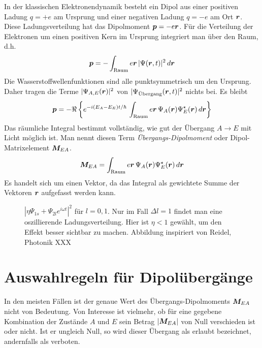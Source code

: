 In der klassischen Elektronendynamik besteht ein Dipol aus einer positiven Ladung $q=+e$ am Ursprung und einer negativen Ladung $q=-e$ am Ort $\boldsymbol{r}$. Diese Ladungsverteilung hat das Dipolmoment $\boldsymbol{p} = -e \boldsymbol{r}$. Für die Verteilung der Elektronen um einen positiven Kern im Ursprung integriert man über den Raum, d.h. 
\begin{equation}
    \boldsymbol{p} = - \int_\text{Raum} e\boldsymbol{r} \,  | \Psi(\boldsymbol{r}, t) |^2 \, d \boldsymbol{r} 
\end{equation}
Die Wasserstoffwellenfunktionen sind alle punktsymmetrisch um den Ursprung. Daher tragen die Terme $ | \Psi_{A,E}(\boldsymbol{r})|^2$ von $| \Psi_\text{Übergang}(\boldsymbol{r},t)|^2$ nichts bei. Es bleibt 
\begin{equation}
    \boldsymbol{p} =  - \Re \left \{ e^{-i (E_A - E_E) t / \hbar}  \, \int_\text{Raum} e\boldsymbol{r} \,  \Psi_A(\boldsymbol{r})\Psi_E^\star(\boldsymbol{r})  \, d \boldsymbol{r} \right \}
\end{equation}
Das räumliche Integral bestimmt vollständig, wie gut der Übergang $A \rightarrow E$ mit Licht möglich ist. Man nennt diesen Term \emph{Übergangs-Dipolmoment} oder Dipol-Matrixelement $\boldsymbol{M}_{EA}$.
\begin{equation}
    \boldsymbol{M}_{EA} = \int_\text{Raum} e\boldsymbol{r} \,  \Psi_A(\boldsymbol{r})\Psi_E^\star(\boldsymbol{r})  \, d \boldsymbol{r} 
    \label{eq:7_Matrix_element}
\end{equation}
Es handelt sich um einen Vektor, da das Integral als gewichtete Summe der Vektoren $\boldsymbol{r}$ aufgefasst werden kann.

\begin{figure}    
    \caption{ $| \eta \Psi_{1s} + \Psi_{2l} e^{i \omega t}|^2$ für $l= 0,1$. Nur im Fall $\Delta l = 1$ findet man eine oszillierende Ladungsverteilung. Hier ist $\eta < 1$ gewählt, um den Effekt besser sichtbar zu machen. Abbildung inspiriert von Reidel, Photonik XXX}
\end{figure}


\section{Auswahlregeln für Dipolübergänge}

In den meisten Fällen ist der genaue Wert des Übergangs-Dipolmoments $\boldsymbol{M}_{EA}$ nicht von Bedeutung. Von Interesse ist vielmehr, ob 
für eine gegebene Kombination der Zustände $A$ und $E$ sein Betrag $|\boldsymbol{M}_{EA}|$ von Null verschieden ist oder nicht. Ist er ungleich Null, so wird dieser Übergang als erlaubt bezeichnet, andernfalls als verboten. 

